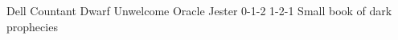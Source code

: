 
\filledCS%
  {Dell Countant}%
  {Dwarf}%
  {Unwelcome Oracle}%
  {Jester}%
  {{0}{-1}{-2}}%
  {{1}{-2}{-1}}%
  {%
    \renewcommand\characterDebt{100 \glspl{sp}}
    \renewcommand\rank{Fodder}
    \renewcommand\charSpells{
      \showSpells{Fate3}

      \showSpells{Fate2}

      \showSpells{Fate1}

      \showSpells{Fate1}
    }
    \setcounter{Academics}{1}
    \setcounter{Caving}{1}
    \setcounter{Performance}{1}
    \setcounter{Fate}{2}
    \shortsword
    \partialchain
  }%
  {\ritualcaster}%
  {Small book of dark prophecies}%


